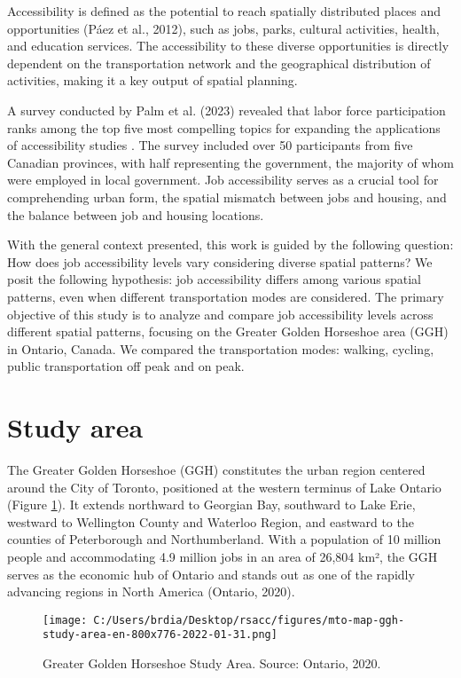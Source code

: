 \documentclass[conference,final,]{IEEEtran}
\begin{document}
Accessibility is defined as the potential to reach spatially distributed
places and opportunities (Páez et al., 2012), such as jobs, parks,
cultural activities, health, and education services. The accessibility
to these diverse opportunities is directly dependent on the
transportation network and the geographical distribution of activities,
making it a key output of spatial planning.

A survey conducted by Palm et al. (2023) revealed that labor force
participation ranks among the top five most compelling topics for
expanding the applications of accessibility studies . The survey
included over 50 participants from five Canadian provinces, with half
representing the government, the majority of whom were employed in local
government. Job accessibility serves as a crucial tool for comprehending
urban form, the spatial mismatch between jobs and housing, and the
balance between job and housing locations.

With the general context presented, this work is guided by the following
question: How does job accessibility levels vary considering diverse
spatial patterns? We posit the following hypothesis: job accessibility
differs among various spatial patterns, even when different
transportation modes are considered. The primary objective of this study
is to analyze and compare job accessibility levels across different
spatial patterns, focusing on the Greater Golden Horseshoe area (GGH) in
Ontario, Canada. We compared the transportation modes: walking, cycling,
public transportation off peak and on peak.

\hypertarget{study-area}{%
\section{Study area}\label{study-area}}

The Greater Golden Horseshoe (GGH) constitutes the urban region centered
around the City of Toronto, positioned at the western terminus of Lake
Ontario (Figure \ref{fig:GGH}). It extends northward to Georgian Bay,
southward to Lake Erie, westward to Wellington County and Waterloo
Region, and eastward to the counties of Peterborough and Northumberland.
With a population of 10 million people and accommodating 4.9 million
jobs in an area of 26,804 km², the GGH serves as the economic hub of
Ontario and stands out as one of the rapidly advancing regions in North
America (Ontario, 2020).

\begin{figure}[!t]
\centering
\texttt{[image: C:/Users/brdia/Desktop/rsacc/figures/mto-map-ggh-study-area-en-800x776-2022-01-31.png]}
\caption{Greater Golden Horseshoe Study Area. Source: Ontario, 2020.}
\label{fig:GGH}
\end{figure}
\end{document}

